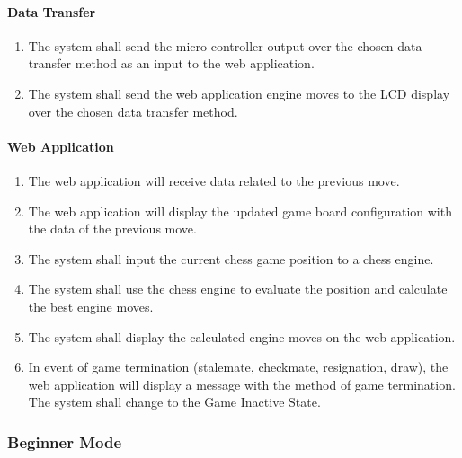 \documentclass[12pt]{article}
\begin{document}
{\paragraph{Data Transfer}
\begin{enumerate}[{ED}1., leftmargin=2\parindent]
    \item The system shall send the micro-controller output over the chosen data transfer method as an input to the web application.
    \item The system shall send the web application engine moves to the LCD display over the chosen data transfer method.
\end{enumerate}

\paragraph{Web Application}
\begin{enumerate}[{EA}1., leftmargin=2\parindent]
    \item The web application will receive data related to the previous move.
    \item The web application will display the updated game board configuration with the data of the previous move.
    \item The system shall input the current chess game position to a chess engine.
    \item The system shall use the chess engine to evaluate the position and calculate the best engine moves.
    \item The system shall display the calculated engine moves on the web application.
    \item In event of game termination (stalemate, checkmate, resignation, draw), the web application will display a message with the method of game termination. The system shall change to the Game Inactive State.
\end{enumerate}

\subsubsection{Beginner Mode}
}
\end{document}
